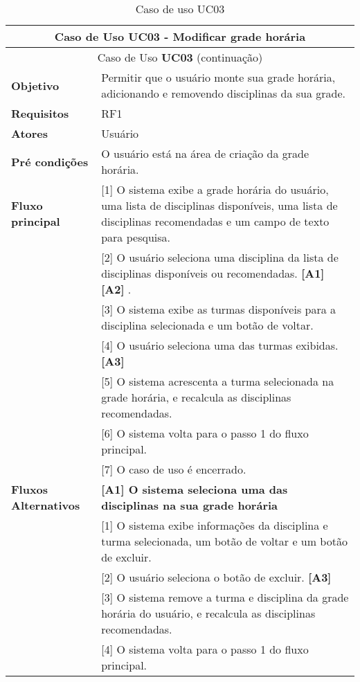 \begin{longtable}{ | m{} | m{} | }
    
    \hline\hline
    
    \multicolumn{2}{|c|}{Caso de Uso \textbf{UC03} - Modificar grade horária}\tabularnewline\hline\hline
    \endfirsthead

    \hline\hline
    \multicolumn{2}{|c|}{Caso de Uso \textbf{UC03} (continuação)}\tabularnewline\hline\hline
    \endhead

    \hline
    \endfoot

    \hline
    \caption{Caso de uso UC03}
    \endlastfoot

    \textbf{Objetivo} & Permitir que o usuário monte sua grade horária, adicionando e removendo disciplinas da sua grade.\tabularnewline\hline
    
    \textbf{Requisitos} & RF1\tabularnewline\hline

    \textbf{Atores} & Usuário\tabularnewline\hline

    \textbf{Pré condições} & O usuário está na área de criação da grade horária.\tabularnewline\hline

    \multirow{1}{*}{\textbf{Fluxo principal}} & [1] O sistema exibe a grade horária do usuário, uma lista de disciplinas disponíveis, uma lista de disciplinas recomendadas e um campo de texto para pesquisa.\tabularnewline\cline{2-2}
    & [2] O usuário seleciona uma disciplina da lista de disciplinas disponíveis ou recomendadas. \textbf{[A1]} \textbf{[A2]} .\tabularnewline\cline{2-2}
    & [3] O sistema exibe as turmas disponíveis para a disciplina selecionada e um botão de voltar.\tabularnewline\cline{2-2}
    & [4] O usuário seleciona uma das turmas exibidas. \textbf{[A3]}\tabularnewline\cline{2-2}
    & [5] O sistema acrescenta a turma selecionada na grade horária, e recalcula as disciplinas recomendadas. \tabularnewline\cline{2-2}
    & [6] O sistema volta para o passo 1 do fluxo principal.\tabularnewline\cline{2-2}
    & [7] O caso de uso é encerrado.\tabularnewline\hline

    \multirow{1}{*}{\textbf{Fluxos Alternativos}} & \textbf{[A1] O sistema seleciona uma das disciplinas na sua grade horária}\tabularnewline\cline{2-2}
    & [1] O sistema exibe informações da disciplina e turma selecionada, um botão de voltar e um botão de excluir.\tabularnewline\cline{2-2} 
    & [2] O usuário seleciona o botão de excluir. \textbf{[A3]}\tabularnewline\cline{2-2} 
    & [3] O sistema remove a turma e disciplina da grade horária do usuário, e recalcula as disciplinas recomendadas. \tabularnewline\cline{2-2}
    & [4] O sistema volta para o passo 1 do fluxo principal. \tabularnewline\cline{2-2}


\end{longtable}
